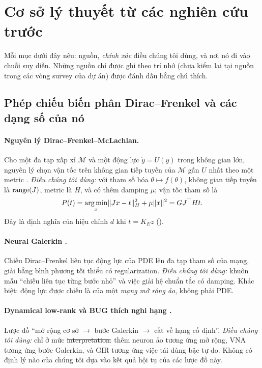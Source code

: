 \section{Cơ sở lý thuyết từ các nghiên cứu trước}\label{sec:foundations}

Mỗi mục dưới đây nêu: nguồn, \emph{chính xác} điều chúng tôi dùng, và nơi nó đi vào chuỗi suy diễn. Những nguồn chỉ được ghi theo trí nhớ (chưa kiểm lại tại nguồn trong các vòng survey của dự án) được đánh dấu bằng chú thích.

\subsection{Phép chiếu biến phân Dirac--Frenkel và các dạng số của nó}

\paragraph{Nguyên lý Dirac--Frenkel--McLachlan.} Cho một đa tạp xấp xỉ $\mathcal M$ và một động lực $\dot y=U(y)$ trong không gian lớn, nguyên lý chọn vận tốc trên không gian tiếp tuyến của $\mathcal M$ gần $U$ nhất theo một metric \cite{lubich2008book,kochlubich2007}. \emph{Điều chúng tôi dùng:} với tham số hóa $\theta\mapsto f(\theta)$, không gian tiếp tuyến là $\operatorname{range}(J)$, metric là $H$, và có thêm damping $\mu$; vận tốc tham số là
\[
P(t)=\operatorname*{arg\,min}_x\lVert Jx-t\rVert_H^2+\mu\lVert x\rVert^2=GJ^{\top} Ht.
\]
Đây là định nghĩa của hiệu chỉnh $d$ khi $t=K_Ez$ ().

\paragraph{Neural Galerkin \cite{bruna2024neuralgalerkin}.} Chiếu Dirac--Frenkel liên tục động lực của PDE lên đa tạp tham số của mạng, giải bằng bình phương tối thiểu có regularization. \emph{Điều chúng tôi dùng:} khuôn mẫu ``chiếu liên tục từng bước nhỏ'' và việc giải hệ chuẩn tắc có damping. Khác biệt: động lực được chiếu là của một \emph{mạng mở rộng ảo}, không phải PDE.

\paragraph{Dynamical low-rank và BUG thích nghi hạng \cite{ceruti2022bug,schotthofer2022dlrt}.} Lược đồ ``mở rộng cơ sở $\to$ bước Galerkin $\to$ cắt về hạng cố định''. \emph{Điều chúng tôi dùng:} chỉ ở mức \st{interpretation}: thêm neuron ảo tương ứng mở rộng, VNA tương ứng bước Galerkin, và GIR tương ứng việc tái dùng bậc tự do. Không có định lý nào của chúng tôi dựa vào kết quả hội tụ của các lược đồ này.

